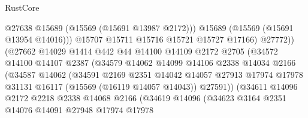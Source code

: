 \begin{lexlean}{RustCore}
\begin{coremodule}
                                    @27638
                                    @15689
                                    (@15569 (@15691 @13987 @2172)))
                                  @15689
                                  (@15569 (@15691 @13954 @14016)))
                                @15707
                                @15711
                                @15716
                                @15721
                                @15727
                                @17166)
                              @27772))
                          (@27662
                            @14029
                            @1414
                            @442
                            @44
                            @14100
                            @14109
                            @2172
                            @2705
                            (@34572
                              @14100
                              @14107
                              @2387
                              (@34579
                                @14062
                                @14099
                                @14106
                                @2338
                                @14034
                                @2166
                                (@34587
                                  @14062
                                  (@34591
                                    @2169
                                    @2351
                                    @14042
                                    @14057
                                    @27913
                                    @17974
                                    @17978
                                    @31131
                                    @16117
                                    (@15569 (@16119 @14057 @14043))
                                    @27591))
                                (@34611
                                  @14096
                                  @2172
                                  @2218
                                  @2338
                                  @14068
                                  @2166
                                  (@34619
                                    @14096
                                    (@34623
                                      @3164
                                      @2351
                                      @14076
                                      @14091
                                      @27948
                                      @17974
                                      @17978

\end{coremodule}
\end{lexlean}
